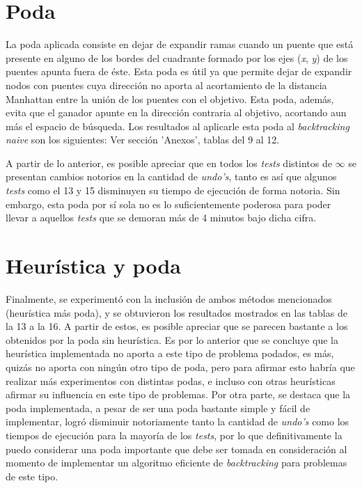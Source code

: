 \documentclass[12pt]{article}
\begin{document}
\section*{Poda}
\hspace{5mm}
La poda aplicada consiste en dejar de expandir ramas cuando un puente que está presente en alguno de los bordes 
del cuadrante formado por los ejes (\textit{x}, \textit{y}) de los puentes apunta fuera de éste. Esta poda es útil
ya que permite dejar de expandir nodos con puentes cuya dirección no aporta al acortamiento de la distancia
Manhattan entre la unión de los puentes con el objetivo. Esta poda, además, evita que el ganador apunte en la dirección
contraria al objetivo, acortando aun más el espacio de búsqueda. Los resultados al aplicarle esta poda al
\textit{backtracking naive} son los siguientes: Ver sección 'Anexos', tablas del 9 al 12.

\hspace{5mm}
A partir de lo anterior, es posible apreciar que en todos los \textit{tests} distintos de $\infty$ se presentan
cambios notorios en la cantidad de \textit{undo's}, tanto es así que algunos \textit{tests} como el 13 y 15 disminuyen
su tiempo de ejecución de forma notoria. Sin embargo, esta poda por sí sola no es lo suficientemente poderosa
para poder llevar a aquellos \textit{tests} que se demoran más de 4 minutos bajo dicha cifra.


\section*{Heurística y poda}
\hspace{5mm}
Finalmente, se experimentó con la inclusión de ambos métodos mencionados (heurística más poda), y se obtuvieron 
los resultados mostrados en las tablas de la 13 a la 16. A partir de estos, es posible apreciar que se parecen bastante a los
obtenidos por la poda sin heurística. Es por lo anterior que se concluye que la heurística implementada no aporta a este tipo
de problema podados, es más, quizás no aporta con ningún otro tipo de poda, pero para afirmar esto habría que realizar más
experimentos con distintas podas, e incluso con otras heurísticas afirmar su influencia en este tipo de problemas.
Por otra parte, se destaca que la poda implementada, a pesar de ser una poda bastante simple y fácil de implementar, logró disminuir
notoriamente tanto la cantidad de \textit{undo's} como los tiempos de ejecución para la mayoría de los \textit{tests}, por lo 
que definitivamente la puedo considerar una poda importante que debe ser tomada en consideración al momento de implementar un
algoritmo eficiente de \textit{backtracking} para problemas de este tipo.
\end{document}
